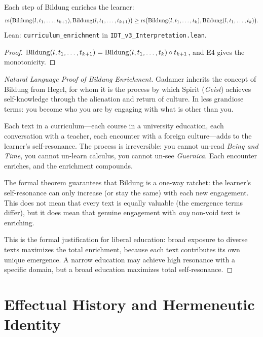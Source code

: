\begin{theorem}
\label{thm:bildung-enriches}
Each step of Bildung enriches the learner:
\[
\mathrm{rs}\bigl(\mathrm{Bildung}(l, t_1, \ldots, t_{k+1}), \mathrm{Bildung}(l, t_1, \ldots, t_{k+1})\bigr)
\geq \mathrm{rs}\bigl(\mathrm{Bildung}(l, t_1, \ldots, t_k), \mathrm{Bildung}(l, t_1, \ldots, t_k)\bigr).
\]
Lean: \texttt{curriculum\_enrichment} in \texttt{IDT\_v3\_Interpretation.lean}.
\end{theorem}

\begin{proof}
$\mathrm{Bildung}(l, t_1, \ldots, t_{k+1}) = \mathrm{Bildung}(l, t_1, \ldots, t_k) \circ t_{k+1}$,
and E4 gives the monotonicity.
\end{proof}

\begin{proof}[Natural Language Proof of Bildung Enrichment]
Gadamer inherits the concept of Bildung from Hegel, for whom it is the
process by which Spirit (\textit{Geist}) achieves self-knowledge through
the alienation and return of culture.  In less grandiose terms: you become
who you are by engaging with what is other than you.

Each text in a curriculum---each course in a university education, each
conversation with a teacher, each encounter with a foreign culture---adds
to the learner's self-resonance.  The process is irreversible: you cannot
un-read \textit{Being and Time}, you cannot un-learn calculus, you cannot
un-see \textit{Guernica}.  Each encounter enriches, and the enrichment
compounds.

The formal theorem guarantees that Bildung is a one-way ratchet: the
learner's self-resonance can only increase (or stay the same) with each
new engagement.  This does not mean that every text is equally valuable
(the emergence terms differ), but it does mean that genuine engagement
with \emph{any} non-void text is enriching.

This is the formal justification for liberal education: broad exposure to
diverse texts maximizes the total enrichment, because each text contributes
its own unique emergence.  A narrow education may achieve high resonance
with a specific domain, but a broad education maximizes total self-resonance.
\end{proof}

\section{Effectual History and Hermeneutic Identity}

